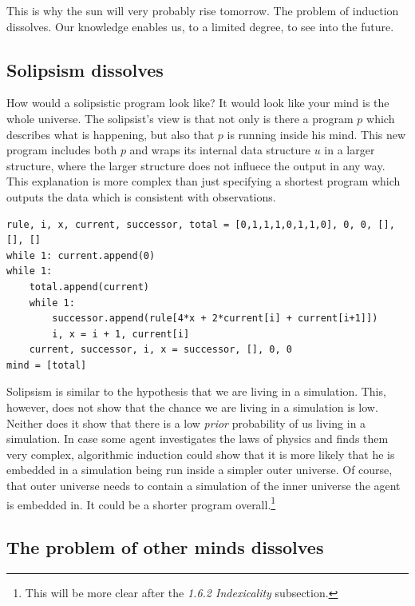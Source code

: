 This is why the sun will very probably rise tomorrow.
The problem of induction dissolves.
Our knowledge enables us, to a limited degree, to see into the future.

\newpage

\subsection{Solipsism dissolves}

How would a solipsistic program look like?
It would look like your mind is the whole universe.
The solipsist's view is that not only is there a program $p$ which describes what is happening, but also that $p$ is running inside his mind.
This new program includes both $p$ and wraps its internal data structure $u$ in a larger structure, where the larger structure does not influece the output in any way.
This explanation is more complex than just specifying a shortest program which outputs the data which is consistent with observations. 

\begin{lstlisting}[caption={A solipsistic program.}]
rule, i, x, current, successor, total = [0,1,1,1,0,1,1,0], 0, 0, [], [], []
while 1: current.append(0)
while 1:
	total.append(current)
	while 1:
		successor.append(rule[4*x + 2*current[i] + current[i+1]])
		i, x = i + 1, current[i]
	current, successor, i, x = successor, [], 0, 0
mind = [total]
\end{lstlisting}

Solipsism is similar to the hypothesis that we are living in a simulation.
This, however, does not show that the chance we are living in a simulation is low.
Neither does it show that there is a low \textit{prior} probability of us living in a simulation.
In case some agent investigates the laws of physics and finds them very complex, algorithmic induction could show that it is more likely that he is embedded in a simulation being run inside a simpler outer universe.
Of course, that outer universe needs to contain a simulation of the inner universe the agent is embedded in.
It could be a shorter program overall.\footnote{This will be more clear after the \textit{1.6.2 Indexicality} subsection.}

\newpage

\subsection{The problem of other minds dissolves}

